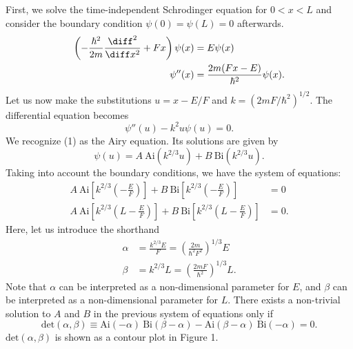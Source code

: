 \documentclass[12pt]{article}
\begin{document}
First, we solve the time-independent Schrodinger equation for $0 < x < L$ and consider the boundary condition $\psi(0) = \psi(L) = 0$ afterwards.
\begin{align*}
	\left( -\frac{\hbar^2}{2m}\frac{\diff ^2}{\diff x ^2} + Fx \right)\psi(x) &= E\psi(x) \\
	\psi ''(x) &= \frac{2m(Fx-E)}{\hbar^2} \psi(x).
\end{align*}
Let us now make the substitutions $u = x - E/F$ and $k = (2mF/\hbar^2)^{1/2}$.  The differential equation becomes
\begin{equation}
	\psi ''(u) - k^2 u \psi(u) = 0.
\end{equation}
We recognize (1) as the Airy equation.  Its solutions are given by 
\begin{equation}
	\psi(u) = A \ \text{Ai}(k^{2/3}u) + B \ \text{Bi}(k^{2/3}u).
\end{equation}
Taking into account the boundary conditions, we have the system of equations:
\begin{align*}
	A \ \text{Ai}\left[ k^{2/3}\left( -\frac{E}{F} \right) \right] + B \ \text{Bi}\left[ k^{2/3}\left(- \frac{E}{F} \right) \right] &= 0 \\
	A \ \text{Ai}\left[ k^{2/3}\left( L-\frac{E}{F} \right) \right] + B \ \text{Bi}\left[ k^{2/3} \left( L - \frac{E}{F} \right) \right] &= 0.
\end{align*}
Here, let us introduce the shorthand
\begin{align*}
	\alpha &= \frac{k^{2/3}E}{F} = \left( \frac{2m}{\hbar^2 F^2} \right)^{1/3} E \\
	\beta &= k^{2/3} L = \left( \frac{2mF}{\hbar^2} \right)^{1/3} L.
\end{align*}
Note that $\alpha$ can be interpreted as a non-dimensional parameter for $E$, and $\beta$ can be interpreted as a non-dimensional parameter for $L$.  There exists a non-trivial solution to $A$ and $B$ in the previous system of equations only if
\begin{equation}
	\text{det}(\alpha, \beta) \equiv \text{Ai}(-\alpha) \ \text{Bi}(\beta - \alpha) - \text{Ai}(\beta - \alpha)\ \text{Bi}(-\alpha) = 0.
\end{equation}
$\text{det}(\alpha,\beta)$ is shown as a contour plot in Figure 1.  
\end{document}
